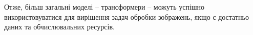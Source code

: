 \documentclass[a4paper,14pt]{extreport}
\begin{document}
Отже, більш загальні моделі -- трансформери -- можуть успішно
використовуватися для вирішення задач обробки зображень, якщо
є достатньо даних та обчислювальних ресурсів.

\newpage



    

\end{document}
